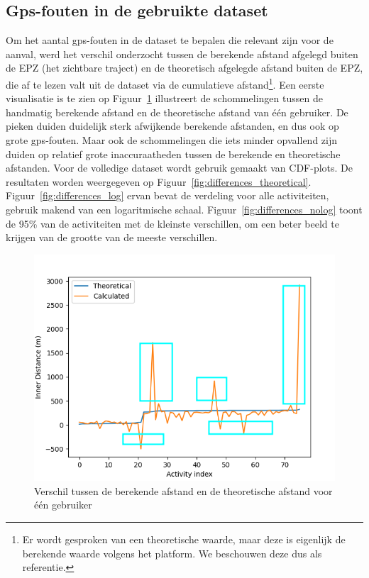 \subsection{Gps-fouten in de gebruikte dataset}
Om het aantal \ac{gps}-fouten in de dataset te bepalen die relevant zijn voor
de aanval, werd het verschil onderzocht tussen de berekende afstand afgelegd
buiten de \ac{EPZ} (het zichtbare traject) en de theoretisch afgelegde afstand
buiten de \ac{EPZ}, die af te lezen valt uit de dataset via de cumulatieve
afstand\footnote{Er wordt gesproken van een theoretische waarde, maar deze is
    eigenlijk de berekende waarde volgens het platform. We beschouwen deze dus als
    referentie.}. Een eerste visualisatie is te zien op
Figuur~\ref{fig:difference_noCDF} illustreert de schommelingen tussen de
handmatig berekende afstand en de theoretische afstand van één gebruiker. De
pieken duiden duidelijk sterk afwijkende berekende afstanden, en dus ook op
grote \ac{gps}-fouten. Maar ook de schommelingen die iets minder opvallend zijn
duiden op relatief grote inaccuraatheden tussen de berekende en theoretische
afstanden. Voor de volledige dataset wordt gebruik gemaakt van \ac{CDF}-plots.
De resultaten worden weergegeven op Figuur~\ref{fig:differences_theoretical}.
Figuur~\ref{fig:differences_log} ervan bevat de verdeling voor alle
activiteiten, gebruik makend van een logaritmische schaal.
Figuur~\ref{fig:differences_nolog} toont de 95\% van de activiteiten met de
kleinste verschillen, om een beter beeld te krijgen van de grootte van de
meeste verschillen.
\begin{figure}
    \centering
    \includegraphics[width=\textwidth]{fig/Afwijkingen&Analyses/Graphs/Verschil_Theoretische_innerDistance.png}
    \caption{Verschil tussen de berekende afstand en de theoretische afstand voor één gebruiker}\label{fig:difference_noCDF}
\end{figure}
